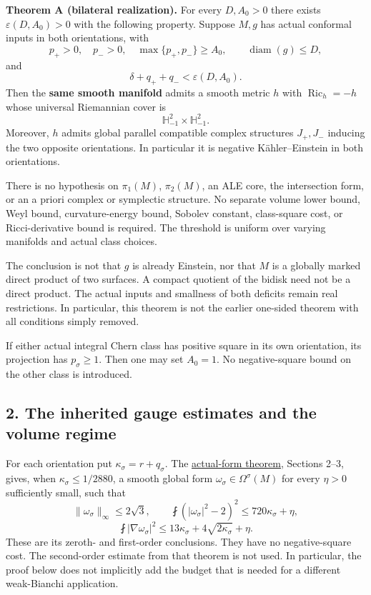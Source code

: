 \documentclass[
  11pt,
]{article}
\begin{document}
\textbf{Theorem A (bilateral realization).} For every \(D,A_0>0\) there
exists \(\varepsilon(D,A_0)>0\) with the following property. Suppose
\(M,g\) has actual conformal inputs in both orientations, with \[
 p_+>0,\quad p_->0,\quad \max\{p_+,p_-\}\ge A_0,
 \qquad \operatorname{diam}(g)\le D,
 \tag{4}
\] and \[
                    \delta+q_++q_-<\varepsilon(D,A_0).
 \tag{5}
\] Then the \textbf{same smooth manifold} admits a smooth metric \(h\)
with \(\operatorname{Ric}_h=-h\) whose universal Riemannian cover is \[
                    \mathbb H^2_{-1}\times\mathbb H^2_{-1}.
 \tag{6}
\] Moreover, \(h\) admits global parallel compatible complex structures
\(J_+,J_-\) inducing the two opposite orientations. In particular it is
negative Kähler--Einstein in both orientations.

There is no hypothesis on \(\pi_1(M)\), \(\pi_2(M)\), an ALE core, the
intersection form, or an a priori complex or symplectic structure. No
separate volume lower bound, Weyl bound, curvature-energy bound, Sobolev
constant, class-square cost, or Ricci-derivative bound is required. The
threshold is uniform over varying manifolds and actual class choices.

The conclusion is not that \(g\) is already Einstein, nor that \(M\) is
a globally marked direct product of two surfaces. A compact quotient of
the bidisk need not be a direct product. The actual inputs and smallness
of both deficits remain real restrictions. In particular, this theorem
is not the earlier one-sided theorem with all conditions simply removed.

If either actual integral Chern class has positive square in its own
orientation, its projection has \(p_\sigma\ge1\). Then one may set
\(A_0=1\). No negative-square bound on the other class is introduced.

\hypertarget{the-inherited-gauge-estimates-and-the-volume-regime}{%
\subsection{2. The inherited gauge estimates and the volume
regime}\label{the-inherited-gauge-estimates-and-the-volume-regime}}

For each orientation put \(\kappa_\sigma=r+q_\sigma\). The
\href{../mathematics/current/line1_composed_application.md}{actual-form
theorem}, Sections 2--3, gives, when \(\kappa_\sigma\le1/2880\), a
smooth global form \(\omega_\sigma\in\Omega^\sigma(M)\) for every
\(\eta>0\) sufficiently small, such that \[
 \|\omega_\sigma\|_\infty\le2\sqrt3,
 \qquad
 \fint(|\omega_\sigma|^2-2)^2\le720\kappa_\sigma+\eta,
 \tag{7}
\] \[
 \fint|\nabla\omega_\sigma|^2
 \le13\kappa_\sigma+4\sqrt{2\kappa_\sigma}+\eta.
 \tag{8}
\] These are its zeroth- and first-order conclusions. They have no
negative-square cost. The second-order estimate from that theorem is not
used. In particular, the proof below does not implicitly add the budget
that is needed for a different weak-Bianchi application.
\end{document}
